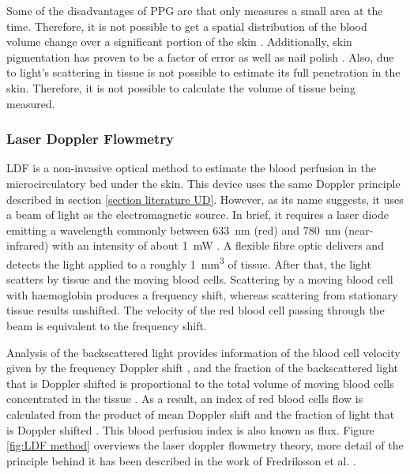 Some of the disadvantages of PPG are that only measures a small area at the time. Therefore, it is not possible to get a spatial distribution of the blood volume change over a significant portion of the skin \cite{wu2003ppgi}. Additionally, skin pigmentation has proven to be a factor of error as well as nail polish \cite{fallow2013influence}. Also, due to light's scattering in tissue is not possible to estimate its full penetration in the skin. Therefore, it is not possible to calculate the volume of tissue being measured.


\subsubsection{Laser Doppler Flowmetry}
\label{section literature LDF}
LDF is a non-invasive optical method to estimate the blood perfusion in the microcirculatory bed under the skin. This device uses the same Doppler principle described in section \ref{section literature UD}. However, as its name suggests, it uses a beam of light as the electromagnetic source. In brief, it requires a laser diode emitting a wavelength commonly between \SI{633}{\nano\metre} (red) and \SI{780}{\nano\metre} (near-infrared) with an intensity of about \SI{1}{\milli\watt} \cite{fredriksson2007laser}. A flexible fibre optic delivers and detects the light applied to a roughly \SI{1}{\cubic\mm} of tissue. After that, the light scatters by tissue and the moving blood cells. Scattering by a moving blood cell with haemoglobin produces a frequency shift, whereas scattering from stationary tissue results unshifted. The velocity of the red blood cell passing through the beam is equivalent to the frequency shift. 

Analysis of the backscattered light provides information of the blood cell velocity given by the frequency Doppler shift \cite{dirnagl1989continuous,fredriksson2007laser}, and the fraction of the backscattered light that is Doppler shifted is proportional to the total volume of moving blood cells concentrated in the tissue \cite{dirnagl1989continuous}. As a result, an index of red blood cells flow is calculated from the product of mean Doppler shift and the fraction of light that is Doppler shifted \cite{dirnagl1989continuous}. This blood perfusion index is also known as flux. Figure \ref{fig:LDF method} overviews the laser doppler flowmetry theory, more detail of the principle behind it has been described in the work of Fredriksson et al. \cite{fredriksson2007laser}.  

